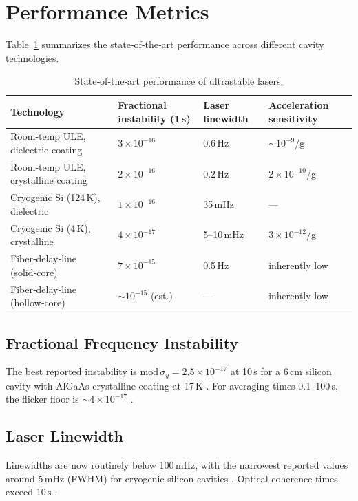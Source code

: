 \documentclass[12pt,a4paper]{article}
\begin{document}
\section{Performance Metrics}\label{sec:metrics}
Table~\ref{tab:performance} summarizes the state‑of‑the‑art performance across different cavity technologies.

\begin{table}[htbp]
\centering
\caption{State‑of‑the‑art performance of ultrastable lasers.}
\label{tab:performance}
\begin{tabular}{llll}
\toprule
\textbf{Technology} & \textbf{Fractional instability (1 s)} & \textbf{Laser linewidth} & \textbf{Acceleration sensitivity} \\
\midrule
Room‑temp ULE, dielectric coating & $3\times10^{-16}$ \cite{young1999} & 0.6 Hz \cite{young1999} & ${\sim}10^{-9}$/g \\
Room‑temp ULE, crystalline coating & $2\times10^{-16}$ \cite{jiang2011} & 0.2 Hz \cite{jin2018} & $2\times10^{-10}$/g \cite{hafner2015} \\
Cryogenic Si (124 K), dielectric & $1\times10^{-16}$ \cite{kessler2012} & 35 mHz \cite{kessler2012} & — \\
Cryogenic Si (4 K), crystalline & $4\times10^{-17}$ \cite{chen2025} & 5–10 mHz \cite{matei2017} & $3\times10^{-12}$/g \cite{herbers2022} \\
Fiber‑delay‑line (solid‑core) & $7\times10^{-15}$ \cite{dong2015} & 0.5 Hz \cite{dong2015} & inherently low \\
Fiber‑delay‑line (hollow‑core) & ${\sim}10^{-15}$ (est.) & — & inherently low \\
\bottomrule
\end{tabular}
\end{table}

\subsection{Fractional Frequency Instability}
The best reported instability is $\mathrm{mod}\,\sigma_y = 2.5\times10^{-17}$ at 10 s for a 6 cm silicon cavity with AlGaAs crystalline coating at 17 K \cite{lee2026}. For averaging times 0.1–100 s, the flicker floor is ${\sim}4\times10^{-17}$ \cite{matei2017,robinson2019}.

\subsection{Laser Linewidth}
Linewidths are now routinely below 100 mHz, with the narrowest reported values around 5 mHz (FWHM) for cryogenic silicon cavities \cite{matei2017,chen2025}. Optical coherence times exceed 10 s \cite{matei2017}.
\end{document}
